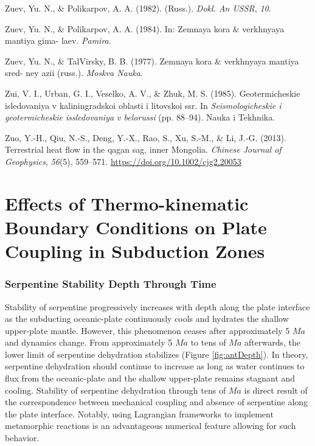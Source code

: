 \begin{CSLReferences}{1}{1}
\leavevmode{}%
Zuev, Yu. N., \& Polikarpov, A. A. (1982). (Russ.). \emph{Dokl. An USSR}, \emph{10}.

\leavevmode{}%
Zuev, Yu. N., \& Polikarpov, A. A. (1984). In: Zemnaya kora \& verkhnyaya mantiya gima- laev. \emph{Pamira}.

\leavevmode{}%
Zuev, Yu. N., \& TalVirsky, B. B. (1977). Zemnaya kora \& verkhnyaya mantiya sred- ney azii (russ.). \emph{Moskva Nauka}.

\leavevmode{}%
Zui, V. I., Urban, G. I., Veselko, A. V., \& Zhuk, M. S. (1985). Geotermicheskie isledovaniya v kaliningradskoi oblasti i litovskoi ssr. In \emph{Seismologicheskie i geotermicheskie issledovaniya v belorussi} (pp. 88--94). Nauka i Tekhnika.

\leavevmode{}%
Zuo, Y.-H., Qiu, N.-S., Deng, Y.-X., Rao, S., Xu, S.-M., \& Li, J.-G. (2013). Terrestrial heat flow in the qagan sag, inner {Mongolia}. \emph{Chinese Journal of Geophysics}, \emph{56}(5), 559--571. \url{https://doi.org/10.1002/cjg2.20053}

\end{CSLReferences}

\cleardoublepage

\hypertarget{appendix-appendix}{%
\appendix}



\hypertarget{effects-of-thermo-kinematic-boundary-conditions-on-plate-coupling-in-subduction-zones}{%
\chapter{Effects of Thermo-kinematic Boundary Conditions on Plate Coupling in Subduction Zones}\label{effects-of-thermo-kinematic-boundary-conditions-on-plate-coupling-in-subduction-zones}}

\hypertarget{antDepth}{%
\subsection{Serpentine Stability Depth Through Time}\label{antDepth}}

Stability of serpentine progressively increases with depth along the plate interface as the subducting oceanic-plate continuously cools and hydrates the shallow upper-plate mantle. However, this phenomenon ceases after approximately 5 \(Ma\) and dynamics change. From approximately 5 \(Ma\) to tens of \(Ma\) afterwards, the lower limit of serpentine dehydration stabilizes (Figure \ref{fig:antDepth}). In theory, serpentine dehydration should continue to increase as long as water continues to flux from the oceanic-plate and the shallow upper-plate remains stagnant and cooling. Stability of serpentine dehydration through tens of \(Ma\) is direct result of the correspondence between mechanical coupling and absence of serpentine along the plate interface. Notably, using Lagrangian frameworks to implement metamorphic reactions is an advantageous numerical feature allowing for such behavior.

